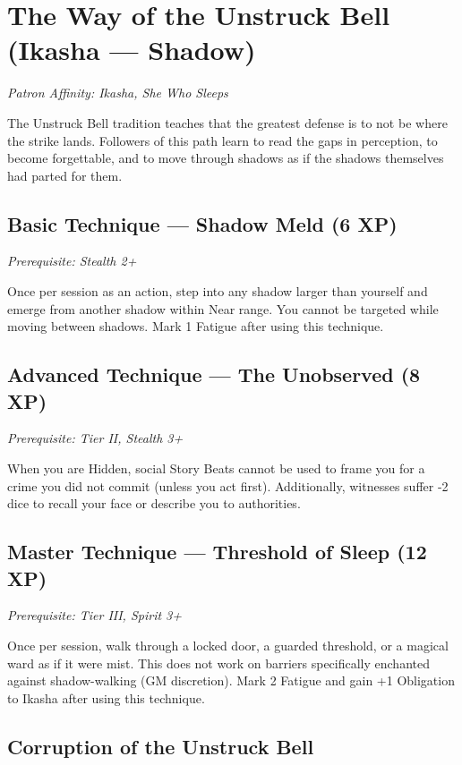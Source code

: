 \documentclass[11pt]{book}
\begin{document}
\section{The Way of the Unstruck Bell (Ikasha --- Shadow)}

\textit{Patron Affinity: Ikasha, She Who Sleeps}

The Unstruck Bell tradition teaches that the greatest defense is to not be where the strike lands. Followers of this path learn to read the gaps in perception, to become forgettable, and to move through shadows as if the shadows themselves had parted for them.

\subsection*{Basic Technique --- Shadow Meld (6 XP)}
\textit{Prerequisite: Stealth 2+}

Once per session as an action, step into any shadow larger than yourself and emerge from another shadow within Near range. You cannot be targeted while moving between shadows. Mark 1 Fatigue after using this technique.

\subsection*{Advanced Technique --- The Unobserved (8 XP)}
\textit{Prerequisite: Tier II, Stealth 3+}

When you are Hidden, social Story Beats cannot be used to frame you for a crime you did not commit (unless you act first). Additionally, witnesses suffer -2 dice to recall your face or describe you to authorities.

\subsection*{Master Technique --- Threshold of Sleep (12 XP)}
\textit{Prerequisite: Tier III, Spirit 3+}

Once per session, walk through a locked door, a guarded threshold, or a magical ward as if it were mist. This does not work on barriers specifically enchanted against shadow-walking (GM discretion). Mark 2 Fatigue and gain +1 Obligation to Ikasha after using this technique.

\subsection*{Corruption of the Unstruck Bell}
\end{document}
